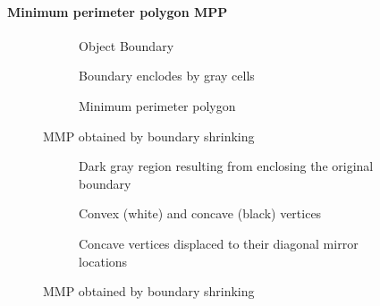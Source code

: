 \paragraph{Minimum perimeter polygon MPP}
\begin{figure}[h]
	\centering
	\begin{subfigure}[b]{0.3\textwidth}
		\centering
		\caption{Object Boundary}
	\end{subfigure}
	\begin{subfigure}[b]{0.3\textwidth}
		\centering
		\caption{Boundary enclodes by gray cells}
	\end{subfigure}
	\begin{subfigure}[b]{0.3\textwidth}
		\centering
		\caption{Minimum perimeter polygon}
	\end{subfigure}
	\caption{MMP obtained by boundary shrinking}
\end{figure}

\begin{figure}[h]
	\centering
	\begin{subfigure}[b]{0.3\textwidth}
		\centering
		\caption{Dark gray region resulting from enclosing the original boundary}
	\end{subfigure}
	\begin{subfigure}[b]{0.3\textwidth}
		\centering
		\caption{Convex (white) and concave (black) vertices}
	\end{subfigure}
	\begin{subfigure}[b]{0.3\textwidth}
		\centering
		\caption{Concave vertices displaced to their diagonal mirror locations}
	\end{subfigure}
	\caption{MMP obtained by boundary shrinking}
\end{figure}

